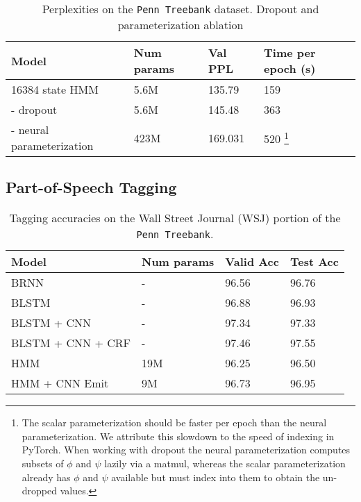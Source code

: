 \documentclass[11pt,a4paper]{article}
\begin{document}
\begin{table*}[!t]
\centering
\caption{\label{tbl:dropout-param-ablation}
Perplexities on the \texttt{Penn Treebank} dataset.
Dropout and parameterization ablation
}
\begin{tabular}{llll}
\toprule
Model                           & Num params & Val PPL & Time per epoch (s)\\
\midrule
16384 state HMM                 & 5.6M    & 135.79  & 159\\
\quad - dropout                 & 5.6M    & 145.48  & 363\\
\quad - neural parameterization & 423M    & 169.031 & 520
\footnote{The scalar parameterization should be faster per epoch than the
neural parameterization. We attribute this slowdown
to the speed of indexing in PyTorch.
When working with dropout
the neural parameterization computes subsets
of $\phi$ and $\psi$ lazily via a matmul,
whereas the scalar parameterization already has $\phi$ and $\psi$
available but must index into them to obtain the
un-dropped values.}\\
\bottomrule
\end{tabular}
\end{table*}

\subsection{Part-of-Speech Tagging}

\begin{table*}[!t]
\centering
\caption{\label{tbl:pos}
Tagging accuracies on the Wall Street Journal (WSJ) portion of the
\texttt{Penn Treebank}.
}
\begin{tabular}{llll}
\toprule
Model                               & Num params & Valid Acc & Test Acc\\
\midrule
BRNN \citep{ma2016crf}              & -          & 96.56     & 96.76    \\ 
BLSTM \citep{ma2016crf}             & -          & 96.88     & 96.93    \\ 
BLSTM + CNN \citep{ma2016crf}       & -          & 97.34     & 97.33    \\ 
BLSTM + CNN + CRF \citep{ma2016crf} & -          & 97.46     & 97.55    \\ 
\midrule
HMM                                 & 19M        & 96.25     & 96.50    \\
HMM + CNN Emit                      & 9M         & 96.73     & 96.95    \\
\bottomrule
\end{tabular}
\end{table*}
\end{document}
